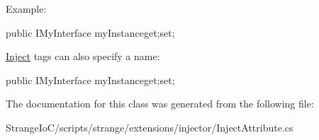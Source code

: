 Example\-: \begin{DoxyVerb}[Inject]
public IMyInterface myInstance{get;set;}
\end{DoxyVerb}


\hyperlink{class_inject}{Inject} tags can also specify a name\-:

\begin{DoxyVerb}
public IMyInterface myInstance{get;set;}\end{DoxyVerb}
 

The documentation for this class was generated from the following file\-:\begin{DoxyCompactItemize}
\item 
Strange\-Io\-C/scripts/strange/extensions/injector/Inject\-Attribute.\-cs\end{DoxyCompactItemize}
